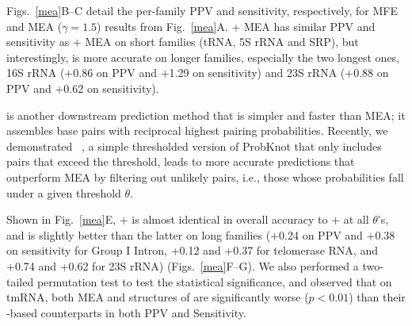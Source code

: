 Figs.~\ref{mea}B--C detail the per-family PPV and sensitivity, respectively,
for MFE and MEA ($\gamma=1.5$) results from Fig.~\ref{mea}A.
\linearpartition + MEA has similar PPV and sensitivity as \rnafold + MEA on short families (tRNA, 5S rRNA and SRP),
but interestingly, is more accurate on longer families, especially the two longest ones, 16S rRNA (+0.86 on PPV and +1.29 on sensitivity) 
and 23S rRNA (+0.88 on PPV and +0.62 on sensitivity). 



\probknot is another downstream prediction method
that is simpler and faster than MEA;
it assembles 
base pairs with reciprocal highest pairing probabilities. 
Recently, we demonstrated \threshknot~\cite{Zhang+:2019}, 
a simple thresholded version of ProbKnot that only includes pairs that exceed the threshold, 
leads to more accurate %
predictions that outperform MEA by filtering out unlikely pairs, i.e., those whose probabilities fall under a given threshold $\theta$.


Shown in Fig.~\ref{mea}E, \linearpartition + \threshknot is almost identical in overall accuracy %
to \rnafold + \threshknot at all $\theta$'s,
and is slightly better than the latter on long families
(+0.24 on PPV and +0.38 on sensitivity for Group I Intron, +0.12 and +0.37 for telomerase RNA, and +0.74 and +0.62 for 23S rRNA)
(Figs.~\ref{mea}F--G).
We also performed a two-tailed permutation test to test the statistical significance, 
and observed that on tmRNA, both MEA and \threshknot structures of \linearpartition are significantly worse ($p\!<\!0.01$) than their \rnafold-based counterparts in both PPV and Sensitivity.


